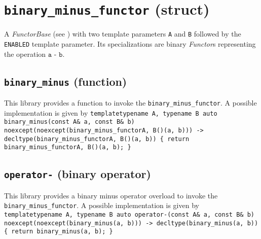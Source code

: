 \section{\texttt{binary\_minus\_functor} (struct)}
A \textit{FunctorBase} (see \cite{functors}) with two template parameters \texttt{A} and \texttt{B} followed by the \texttt{ENABLED} template parameter.
Its specializations are binary \textit{Functor}s representing the operation $\texttt{a - b}$.

\subsection{\texttt{binary\_minus} (function)}
This library provides a function to invoke the \texttt{binary\_minus\_functor}.
A possible implementation is given by\newline
\texttt{template\textlangle typename A, typename B\textrangle\newline
auto\newline
binary\_minus(const A\& a, const B\& b)\newline
noexcept(noexcept(binary\_minus\_functor\textlangle A, B\textrangle()(a, b)))\newline
-> decltype(binary\_minus\_functor\textlangle A, B\textrangle()(a, b))\newline
\{ return binary\_minus\_functor\textlangle A, B\textrangle()(a, b); \}}

\subsection{\texttt{operator-} (binary operator)}
This library provides a binary minus operator overload to invoke the \texttt{binary\_minus\_functor}.
A possible implementation is given by\newline
\texttt{template\textlangle typename A, typename B\textrangle\newline
auto\newline
operator-(const A\& a, const B\& b)\newline
noexcept(noexcept(binary\_minus(a, b)))
-> decltype(binary\_minus(a, b))\newline
\{ return binary\_minus(a, b); \}}